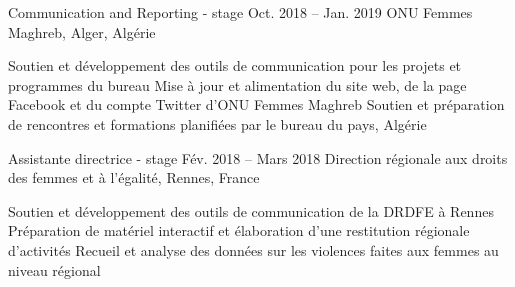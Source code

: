 \begin{joblist}

\item[Communication and Reporting - stage]{Oct. 2018 -- Jan. 2019 }     
	{ONU Femmes Maghreb, Alger, Algérie}     
	{
			 
		\vspace{-0.5cm}
		\begin{itemize}
			  \iftbftiny \setlength\itemsep{-3pt} \fi
			  \cvitem[\checkmark] Soutien et développement des outils de communication pour les projets et programmes du bureau      
 			  \cvitem[\checkmark] Mise à jour et alimentation du site web, de la page Facebook et du compte Twitter d’ONU Femmes Maghreb                                                            
			  \cvitem[\checkmark] Soutien et préparation de rencontres et formations planifiées par le bureau du pays, Algérie
		\end{itemize}      

	}


\item[Assistante directrice - stage]{Fév. 2018 -- Mars 2018 }     
	{Direction régionale aux droits des femmes et à l'égalité, Rennes, France}     
	{
			 
		\iftbftiny \vspace{-0.5cm} \fi
		\begin{itemize}
			  \iftbftiny \setlength\itemsep{-3pt} \fi
			  \cvitem[\checkmark] Soutien et développement des outils de communication de la DRDFE à Rennes      
			  \cvitem[\checkmark] Préparation de matériel interactif et élaboration d'une restitution régionale d'activités
			  \cvitem[\checkmark] Recueil et analyse des données sur les violences faites aux femmes au niveau régional
		\end{itemize}      

}
\end{joblist}
